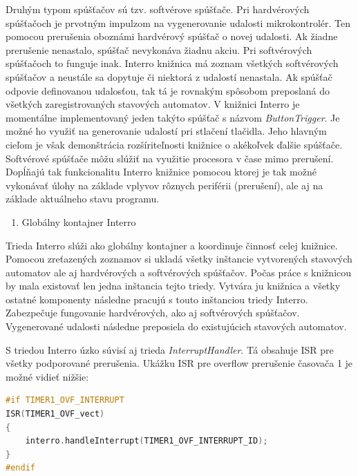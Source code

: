 Druhým typom spúšťačov sú tzv. softvérove spúšťače. Pri hardvérových spúšťačoch je prvotným impulzom na vygenerovanie udalosti mikrokontrolér. Ten pomocou prerušenia
oboznámi hardvérový spúšťač o novej udalosti. Ak žiadne prerušenie nenastalo, spúšťač nevykonáva žiadnu akciu. Pri softvérových spúšťačoch to funguje inak. Interro knižnica
má zoznam všetkých softvérových spúšťačov a neustále sa dopytuje či niektorá z udalostí nenastala. Ak spúšťač odpovie definovanou udalosťou,
tak tá je rovnakým spôsobom preposlaná do všetkých zaregistrovaných stavových automatov. V knižnici Interro je momentálne implementovaný jeden takýto spúšťač s názvom
\textit{ButtonTrigger}. Je možné ho využiť na generovanie udalostí pri stlačení tlačidla. Jeho hlavným cieľom je však demonštrácia rozšíriteľnosti  knižnice o akékoľvek
ďalšie spúšťače. Softvérové spúšťače môžu slúžiť na využitie procesora v čase mimo prerušení. Dopĺňajú tak funkcionalitu Interro knižnice pomocou ktorej je tak
možné vykonávať úlohy na základe vplyvov rôznych periférii (prerušení), ale aj na základe aktuálneho stavu programu. \par

\begin{enumerate}[resume]
    \item Globálny kontajner Interro
\end{enumerate}

Trieda Interro slúži ako globálny kontajner a koordinuje činnosť celej knižnice. Pomocou zreťazených zoznamov si ukladá všetky inštancie vytvorených stavových automatov
ale aj hardvérových a softvérových spúšťačov. Počas práce s knižnicou by mala existovať len jedna inštancia tejto triedy. Vytvára ju knižnica a všetky ostatné komponenty
následne pracujú s touto inštanciou triedy Interro. Zabezpečuje fungovanie hardvérových, ako aj softvérových spúšťačov. Vygenerované udalosti následne preposiela do
existujúcich stavových automatov. \par
S triedou Interro úzko súvisí aj trieda \textit{InterruptHandler}. Tá obsahuje ISR pre všetky podporované prerušenia. Ukážku ISR pre overflow prerušenie časovača 1
je možné vidieť nižšie:
\begin{lstlisting}[language=c++]  
#if TIMER1_OVF_INTERRUPT
ISR(TIMER1_OVF_vect)
{
    interro.handleInterrupt(TIMER1_OVF_INTERRUPT_ID);
}
#endif
\end{lstlisting}


